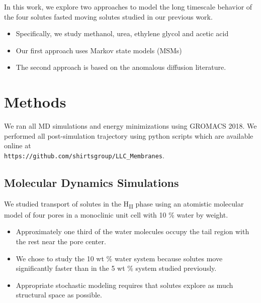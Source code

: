 \documentclass{article}
\begin{document}
  In this work, we explore two approaches to model the long timescale behavior
  of the four solutes fasted moving solutes studied in our previous work.
  \begin{itemize}
    \item Specifically, we study methanol, urea, ethylene glycol and acetic acid
  	\item Our first approach uses Markov state models (MSMs) 
  	\item The second approach is based on the anomalous diffusion literature.
  \end{itemize}

  \section{Methods}
    
  We ran all MD simulations and energy minimizations using GROMACS 2018. We  %
  performed all post-simulation trajectory using python scripts which are available
  online at \\ \texttt{https://github.com/shirtsgroup/LLC\_Membranes}.

  \subsection{Molecular Dynamics Simulations}

  We studied transport of solutes in the H\textsubscript{II} phase using an
  atomistic molecular model of four pores in a monoclinic unit cell with 
  10 \% water by weight. 
  \begin{itemize}
    \item Approximately one third of the water molecules occupy the tail region 
    with the rest near the pore center.
    \item We chose to study the 10 wt \% water system because solutes move 
    significantly faster than in the 5 wt \% system studied previously.
    \item Appropriate stochastic modeling requires that solutes explore 
    as much structural space as possible.  %
  \end{itemize}
  
\end{document}
